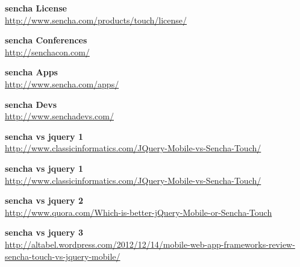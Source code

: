 \documentclass[a4paper,12pt]{book}
\begin{document}
\begin{thebibliography}{25}
\textbf{sencha License}\\
{\footnotesize\url{http://www.sencha.com/products/touch/license/}}

\textbf{sencha Conferences}\\
{\footnotesize\url{http://senchacon.com/}}

\textbf{sencha Apps}\\
{\footnotesize\url{http://www.sencha.com/apps/}}

\textbf{sencha Devs}\\
{\footnotesize\url{http://www.senchadevs.com/}}

\textbf{sencha vs jquery 1}\\
{\footnotesize\url{http://www.classicinformatics.com/JQuery-Mobile-vs-Sencha-Touch/}}

\textbf{sencha vs jquery 1}\\
{\footnotesize\url{http://www.classicinformatics.com/JQuery-Mobile-vs-Sencha-Touch/}}

\textbf{sencha vs jquery 2}\\
{\footnotesize\url{http://www.quora.com/Which-is-better-jQuery-Mobile-or-Sencha-Touch}}

\textbf{sencha vs jquery 3}\\
{\footnotesize\url{http://altabel.wordpress.com/2012/12/14/mobile-web-app-frameworks-review-sencha-touch-vs-jquery-mobile/}}

\end{thebibliography}
\end{document}

